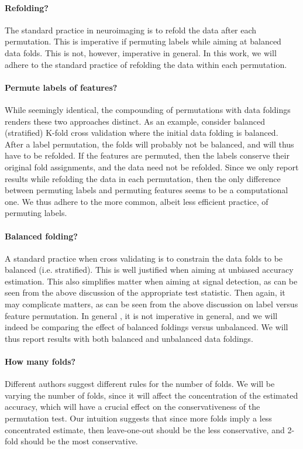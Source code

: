 \documentclass[12pt,a4paper]{article}
\begin{document}
\begin{description}
\paragraph{Refolding?}
The standard practice in neuroimaging is to refold the data after each permutation.
This is imperative if permuting labels while aiming at balanced data folds. 
This is not, however, imperative in general. 
In this work, we will adhere to the standard practice of refolding the data within each permutation.


\paragraph{Permute labels of features?}
While seemingly identical, the compounding of permutations with data foldings renders these two approaches distinct. 
As an example, consider balanced (stratified) K-fold cross validation where the initial data folding is balanced. 
After a label permutation, the folds will probably not be balanced, and will thus have to be refolded. 
If the features are permuted, then the labels conserve their original fold assignments, and the data need not be refolded. 
Since we only report results while refolding the data in each permutation, then the only difference between permuting labels and permuting features seems to be a computational one. 
We thus adhere to the more common, albeit less efficient practice, of permuting labels. 


\paragraph{Balanced folding?}
A standard practice when cross validating is to constrain the data folds to be balanced (i.e. stratified).
This is well justified when aiming at unbiased accuracy estimation. 
This also simplifies matter when aiming at signal detection, as can be seen from the above discussion of the appropriate test statistic. 
Then again, it may complicate matters, as can be seen from the above discussion on label versus feature permutation. 
In general , it is not imperative in general, and we will indeed be comparing the effect of balanced foldings versus unbalanced. 
We will thus report results with both balanced and unbalanced data foldings. 


\paragraph{How many folds?}
Different authors suggest different rules for the number of folds. 
We will be varying the number of folds, since it will affect the concentration of the estimated accuracy, which will have a crucial effect on the conservativeness of the permutation test. 
Our intuition suggests that since more folds imply a less concentrated estimate, then leave-one-out should be the less conservative, and 2-fold should be the most conservative. 

\end{description}
\end{document}
